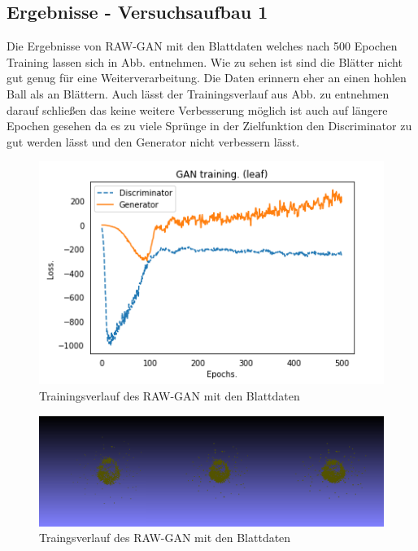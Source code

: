 \documentclass{llncs}
\begin{document}
\subsection{Ergebnisse - Versuchsaufbau 1}

Die Ergebnisse von RAW-GAN mit den Blattdaten welches nach 500 Epochen Training lassen sich in Abb. entnehmen. Wie zu sehen ist sind die Blätter nicht gut genug für eine Weiterverarbeitung. Die Daten erinnern eher an einen hohlen Ball als an Blättern. Auch lässt der Trainingsverlauf aus Abb. zu entnehmen darauf schließen das keine weitere Verbesserung möglich ist auch auf längere Epochen gesehen da es zu viele Sprünge in der Zielfunktion den Discriminator zu gut werden lässt und den Generator nicht verbessern lässt. 

\begin{figure}[htbp] 
	\centering
	\includegraphics[width=1.2\textwidth]{raw_gan_leaf_result.png}
	\caption{Trainingsverlauf des RAW-GAN mit den Blattdaten}
	\label{fig:Bild35}
\end{figure}
\begin{figure}[htbp] 
	\centering
	\includegraphics[width=1.2\textwidth]{raw_gan_leaf_example.png}
	\caption{Traingsverlauf des RAW-GAN mit den Blattdaten}
	\label{fig:Bild36}
\end{figure}
\end{document}
